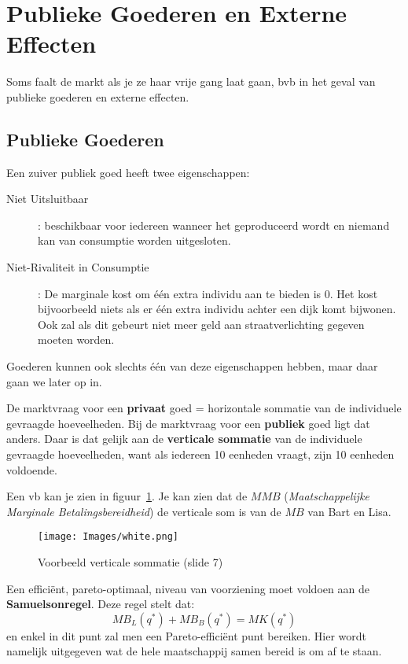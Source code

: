 \section{Publieke Goederen en Externe Effecten}

Soms faalt de markt als je ze haar vrije gang laat gaan, bvb in het geval van publieke goederen en externe effecten.

\subsection{Publieke Goederen}

Een zuiver publiek goed heeft twee eigenschappen:
\begin{description}
   \item[Niet Uitsluitbaar]: beschikbaar voor iedereen wanneer het geproduceerd wordt en niemand kan van consumptie worden uitgesloten.
   \item[Niet-Rivaliteit in Consumptie]: De marginale kost om \'e\'en extra individu aan te bieden is 0. Het kost bijvoorbeeld niets als er \'e\'en extra individu achter een dijk komt bijwonen. Ook zal als dit gebeurt niet meer geld aan straatverlichting gegeven moeten worden.
\end{description}

Goederen kunnen ook slechts \'e\'en van deze eigenschappen hebben, maar daar gaan we later op in.

De marktvraag voor een \textbf{privaat} goed = horizontale sommatie van de individuele gevraagde hoeveelheden. Bij de marktvraag voor een \textbf{publiek} goed ligt dat anders. Daar is dat gelijk aan de \textbf{verticale sommatie} van de individuele gevraagde hoeveelheden, want als iedereen 10 eenheden vraagt, zijn 10 eenheden voldoende.

Een vb kan je zien in figuur~\ref{fig:voorbeeldPubliekGoed}. Je kan zien dat de $MMB$ (\textit{Maatschappelijke Marginale Betalingsbereidheid}) de verticale som is van de $MB$ van Bart en Lisa.

\begin{figure}[htbp]
   \centering
   \texttt{[image: Images/white.png]}
   \caption{Voorbeeld verticale sommatie (slide 7)}
   \label{fig:voorbeeldPubliekGoed}
\end{figure}

Een effici\"ent, pareto-optimaal, niveau van voorziening moet voldoen aan de \textbf{Samuelsonregel}. Deze regel stelt dat:
\begin{equation}
   MB_L(q^*) + MB_B(q^*) = MK(q^*)
\end{equation}
en enkel in dit punt zal men een Pareto-effici\"ent punt bereiken. Hier wordt namelijk uitgegeven wat de hele maatschappij samen bereid is om af te staan.

